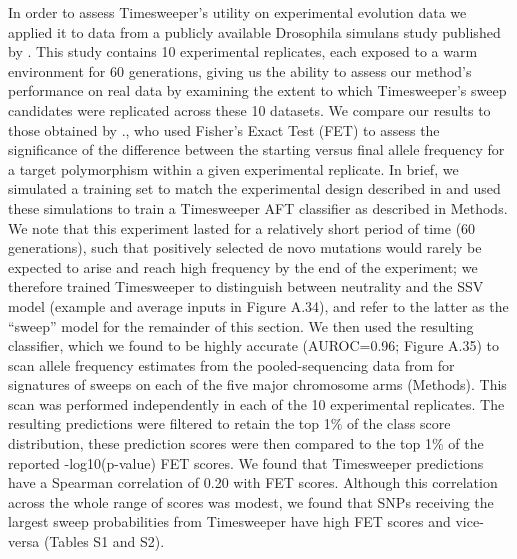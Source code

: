 In order to assess Timesweeper’s utility on experimental evolution data we applied it to data from a publicly available Drosophila simulans study published by \cite{barghiGeneticRedundancyFuels2019}. This study contains 10 experimental replicates, each exposed to a warm environment for 60 generations, giving us the ability to assess our method’s performance on real data by examining the extent to which Timesweeper’s sweep candidates were replicated across these 10 datasets. We compare our results to those obtained by \cite{barghiGeneticRedundancyFuels2019}., who used Fisher’s Exact Test (FET) to assess the significance of the difference between the starting versus final allele frequency for a target polymorphism within a given experimental replicate. 
In brief, we simulated a training set to match the experimental design described in \cite{barghiGeneticRedundancyFuels2019} and used these simulations to train a Timesweeper AFT classifier as described in Methods. We note that this experiment lasted for a relatively short period of time (60 generations), such that positively selected de novo mutations would rarely be expected to arise and reach high frequency by the end of the experiment; we therefore trained Timesweeper to distinguish between neutrality and the SSV model (example and average inputs in Figure A.34), and refer to the latter as the “sweep” model for the remainder of this section. We then used the resulting classifier, which we found to be highly accurate (AUROC=0.96; Figure A.35) to scan allele frequency estimates from the pooled-sequencing data from \cite{barghiGeneticRedundancyFuels2019} for signatures of sweeps on each of the five major chromosome arms (Methods). This scan was performed independently in each of the 10 experimental replicates. The resulting predictions were filtered to retain the top 1\% of the class score distribution, these prediction scores were then compared to the top 1\% of the reported -log10(p-value) FET scores. We found that Timesweeper predictions have a Spearman correlation of 0.20 with FET scores. Although this correlation across the whole range of scores was modest, we found that SNPs receiving the largest sweep probabilities from Timesweeper have high FET scores and vice-versa (Tables S1 and S2).

